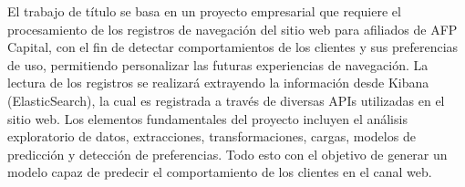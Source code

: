 El trabajo de título se basa en un proyecto empresarial que requiere el procesamiento de los registros de navegación del sitio web para afiliados de AFP Capital, con el fin de detectar comportamientos de los clientes y sus preferencias de uso, permitiendo personalizar las futuras experiencias de navegación. La lectura de los registros se realizará extrayendo la información desde Kibana (ElasticSearch), la cual es registrada a través de diversas APIs utilizadas en el sitio web. Los elementos fundamentales del proyecto incluyen el análisis exploratorio de datos, extracciones, transformaciones, cargas, modelos de predicción y detección de preferencias. Todo esto con el objetivo de generar un modelo capaz de predecir el comportamiento de los clientes en el canal web.